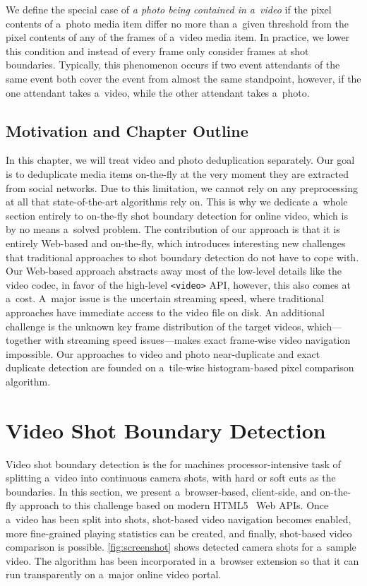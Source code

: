 We define the special case of
\emph{a photo being contained in a~video} if the pixel contents
of a~photo media item differ no more than a~given threshold from
the pixel contents of any of the frames of a~video media item.
In practice, we lower this condition and instead of every frame
only consider frames at shot boundaries.
Typically, this phenomenon occurs if two event attendants
of the same event both cover the event from almost the same
standpoint, however, if the one attendant takes a~video,
while the other attendant takes a~photo.

\subsection{Motivation and Chapter Outline}

In this chapter, we will treat video
and photo deduplication separately. 
Our goal is to deduplicate media items on-the-fly
at the very moment they are extracted from social networks.
Due to this limitation, we cannot rely on any preprocessing
at all that state-of-the-art algorithms rely on.
This is why we dedicate a~whole section entirely to on-the-fly
shot boundary detection for online video,
which is by no means a~solved problem.
The contribution of our approach is that it is entirely Web-based
and on-the-fly, which introduces interesting new challenges
that traditional approaches to shot boundary detection
do not have to cope with.
Our Web-based approach abstracts away most of the low-level details
like the video codec, in favor of the high-level \texttt{<video>}
API, however, this also comes at a~cost.
A~major issue is the uncertain streaming speed,
where traditional approaches have immediate access
to the video file on disk.
An additional challenge is the unknown key frame distribution
of the target videos, which---together with streaming speed
issues---makes exact frame-wise video navigation impossible.
Our approaches to video and photo near-duplicate
and exact duplicate detection are founded
on a~tile-wise histogram-based pixel comparison algorithm.

\section{Video Shot Boundary Detection} \label{sec:videoshotboundarydetection}
Video shot boundary detection is the for machines processor-intensive task
of splitting a~video into continuous camera shots,
with hard or soft cuts as the boundaries.
In this section, we present a~browser-based, client-side, and
on-the-fly approach to this challenge
based on modern HTML5~\cite{berjon2012html5} Web APIs.
Once a~video has been split into shots,
shot-based video navigation becomes enabled,
more fine-grained playing statistics can be created,
and finally, shot-based video comparison is possible.
\autoref{fig:screenshot} shows detected camera
shots for a~sample video.
The algorithm has been incorporated in a~browser extension
so that it can run transparently on a~major online video portal.

